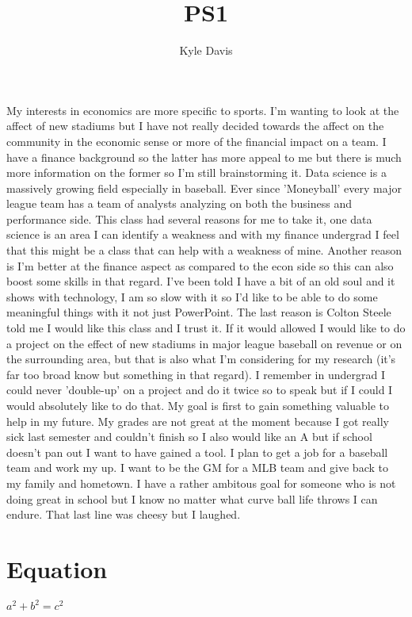 \documentclass{article}
\title{PS1}
\author{Kyle Davis}
\begin{document}
\maketitle


\section{}
My interests in economics are more specific to sports. I'm wanting to look at the affect of new stadiums but I have not really decided towards the affect on the community in the economic sense or more of the financial impact on a team. I have a finance background so the latter has more appeal to me but there is much more information on the former so I'm still brainstorming it. Data science is a massively growing field especially in baseball. Ever since 'Moneyball' every major league team has a team of analysts analyzing on both the business and performance side. This class had several reasons for me to take it, one data science is an area I can identify a weakness and with my finance undergrad I feel that this might be a class that can help with a weakness of mine. Another reason is I'm better at the finance aspect as compared to the econ side so this can also boost some skills in that regard. I've been told I have a bit of an old soul and it shows with technology, I am so slow with it so I'd like to be able to do some meaningful things with it not just PowerPoint. The last reason is Colton Steele told me I would like this class and I trust it. If it would allowed I would like to do a project on the effect of new stadiums in major league baseball on revenue or on the surrounding area, but that is also what I'm considering for my research (it's far too broad know but something in that regard). I remember in undergrad I could never 'double-up' on a project and do it twice so to speak but if I could I would absolutely like to do that. My goal is first to gain something valuable to help in my future. My grades are not great at the moment because I got really sick last semester and couldn't finish so I also would like an A but if school doesn't pan out I want to have gained a tool. I plan to get a job for a baseball team and work my up. I want to be the GM for a MLB team and give back to my family and hometown. I have a rather ambitous goal for someone who is not doing great in school but I know no matter what curve ball life throws I can endure. That last line was cheesy but I laughed.


\section{Equation}

\(a^2 + b^2 = c^2\)
\end{document}

